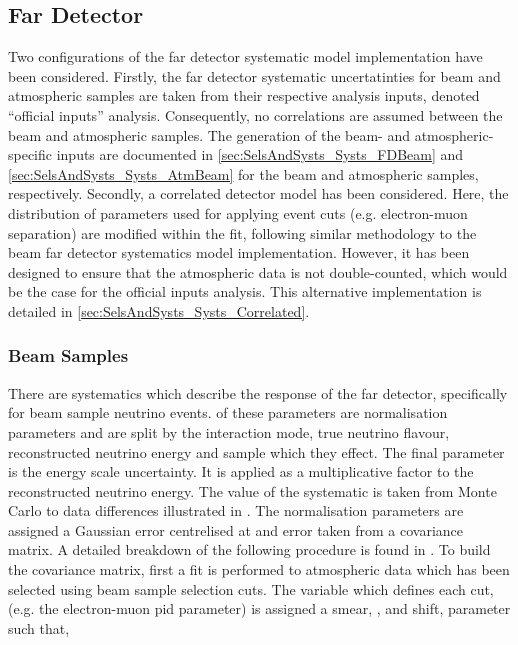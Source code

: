 \subsection{Far Detector}
\label{sec:SelsAndSysts_Systs_FD}

Two configurations of the far detector systematic model implementation have been considered. Firstly, the far detector systematic uncertatinties for beam and atmospheric samples are taken from their respective analysis inputs, denoted ``official inputs'' analysis. Consequently, no correlations are assumed between the beam and atmospheric samples. The generation of the beam- and atmospheric- specific inputs are documented in \autoref{sec:SelsAndSysts_Systs_FDBeam} and \autoref{sec:SelsAndSysts_Systs_AtmBeam} for the beam and atmospheric samples, respectively. Secondly, a correlated detector model has been considered. Here, the distribution of parameters used for applying event cuts (e.g. electron-muon separation) are modified within the fit, following similar methodology to the beam far detector systematics model implementation. However, it has been designed to ensure that the atmospheric data is not double-counted, which would be the case for the official inputs analysis. This alternative implementation is detailed in \autoref{sec:SelsAndSysts_Systs_Correlated}.

\subsubsection{Beam Samples}
\label{sec:SelsAndSysts_Systs_FDBeam}

There are  systematics which describe the response of the far detector, specifically for beam sample neutrino events.  of these parameters are normalisation parameters and are split by the interaction mode, true neutrino flavour, reconstructed neutrino energy and sample which they effect. The final parameter is the energy scale uncertainty. It is applied as a multiplicative factor to the reconstructed neutrino energy. The value of the systematic is taken from Monte Carlo to data differences illustrated in \cite{sk_2017}. The normalisation parameters are assigned a Gaussian error centrelised at  and error taken from a covariance matrix. A detailed breakdown of the following procedure is found in \cite{t2k_tn_318}. To build the covariance matrix, first a fit is performed to atmospheric data which has been selected using beam sample selection cuts. The variable which defines each cut,  (e.g. the electron-muon pid parameter) is assigned a smear, \quickmath{\alpha}, and shift, \quickmath{\beta} parameter such that,

